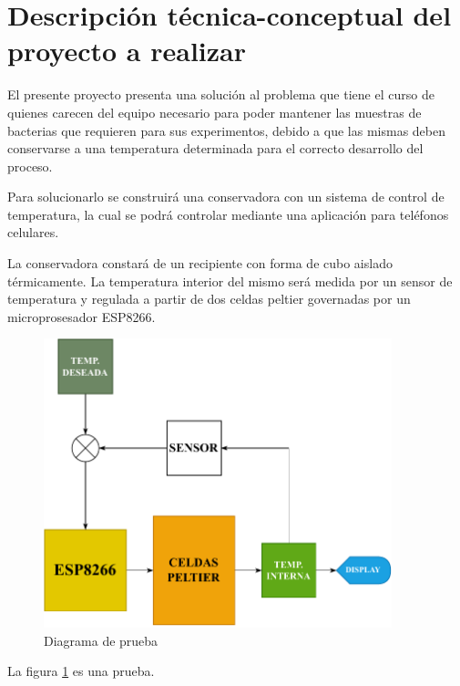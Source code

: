 \section{Descripción técnica-conceptual del proyecto a realizar}
\label{sec:descripcion}

\quad El presente proyecto presenta una solución al problema que tiene el curso de \empclientename\hspace{1px} quienes carecen del equipo necesario para poder mantener las muestras de bacterias que requieren para sus experimentos, debido a que las mismas deben conservarse a una temperatura determinada para el correcto desarrollo del proceso.

\quad Para solucionarlo se construirá una conservadora con un sistema de control de temperatura, la cual se podrá controlar mediante una aplicación para teléfonos celulares.

\quad La conservadora constará de un recipiente con forma de cubo aislado térmicamente. La temperatura interior del mismo será medida por un sensor de temperatura y regulada a partir de dos celdas peltier governadas por un microprosesador ESP8266.
\newline
\begin{figure}[h]
  \centering
  \includegraphics[width=0.9\textwidth]{./Figuras/diagrama.pdf}
  \caption{Diagrama de prueba}
  \label{fig:diagrama}
\end{figure}
\quad La figura \ref{fig:diagrama} es una prueba.
\pagebreak